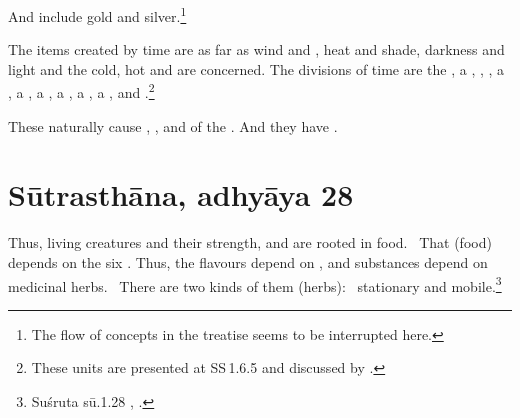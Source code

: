 \documentclass[12pt]{article}
\newcommand{\VN}[2]{%
SS\,#1}
\begin{document}
\begin{translation}
 \item[34] And  include gold and 
 silver.\footnote{The flow of concepts in the treatise seems to be interrupted here.}
 
\item[35] The items created by time are  
as far as wind and , heat and shade, darkness and light
and the cold, hot and  are concerned. 
The divisions of time are the
, a
, 
, 
, a
, a
, a
, a
, a
, a
,
and
.\footnote{These units are presented at 
\VN{1.6.5}{} and discussed by \citet[\S\,59]{haya-2017}.}


\item[36]  These naturally cause 
, 
, 
and 
 of the . And they have
    .



    
\end{translation}    
    

  
    \newpage

\section{Sūtrasthāna, adhyāya 28}
    
\begin{translation}    
    \item [1] Thus, living creatures and their strength,
 and  are rooted in food.  That
(food) depends on the six . Thus, the flavours depend
on , and substances depend on medicinal herbs. 
There are two kinds of them (herbs):  stationary and mobile.\footnote{Suśruta
sū.1.28 \cite[I, 21]{shar-susr}, \cite[7]{susr-trikamji2004}.}
\end{translation}

\nocite{*}

\newpage

    \printshorthands
    
    
    \printbibliography[notkeyword=edition,
        notkeyword=shorthand]
 
    \printindex[lexical]
    

\printindex[manuscripts]

    
\end{document}
